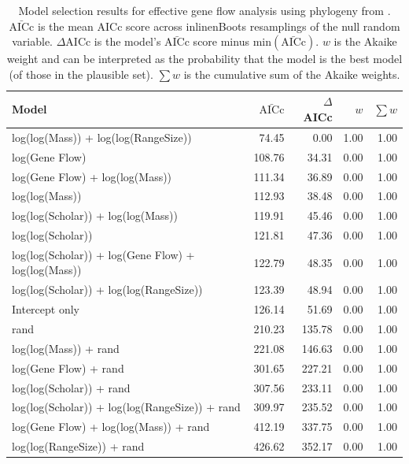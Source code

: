 \begin{table}[ht]
\centering
\caption[
  Full model selection results for effective gene flow analysis with alternative phylogeny. 
]{
  Model selection results for effective gene flow analysis using phylogeny from \cite{jones2005bats}. 
  $\bar{\text{AICc}}$ is the mean AICc score across 
inline{nBoots} resamplings of the null random variable. 
  $\Delta$AICc is the model's $\bar{\text{AICc}}$ score minus $\text{min}(\bar{\text{AICc}})$. 
  $w$ is the Akaike weight and can be interpreted as the probability that the model is the best model (of those in the plausible set).
  $\sum w$ is the cumulative sum of the Akaike weights.
  } 
\label{A-fstModelWeights2}
\begingroup\scriptsize
\begin{tabular}{@{}lrrrr@{}}
  \toprule
Model & $\bar{\text{AICc}}$ & $\Delta$AICc & $w$ & $\sum w$ \\ 
  \midrule
log(log(Mass)) + log(log(RangeSize)) & 74.45 & 0.00 & 1.00 & 1.00 \\ 
  log(Gene Flow) & 108.76 & 34.31 & 0.00 & 1.00 \\ 
  log(Gene Flow) + log(log(Mass)) & 111.34 & 36.89 & 0.00 & 1.00 \\ 
  log(log(Mass)) & 112.93 & 38.48 & 0.00 & 1.00 \\ 
  log(log(Scholar)) + log(log(Mass)) & 119.91 & 45.46 & 0.00 & 1.00 \\ 
  log(log(Scholar)) & 121.81 & 47.36 & 0.00 & 1.00 \\ 
  log(log(Scholar)) + log(Gene Flow) + log(log(Mass)) & 122.79 & 48.35 & 0.00 & 1.00 \\ 
  log(log(Scholar)) + log(log(RangeSize)) & 123.39 & 48.94 & 0.00 & 1.00 \\ 
  Intercept only & 126.14 & 51.69 & 0.00 & 1.00 \\ 
  rand & 210.23 & 135.78 & 0.00 & 1.00 \\ 
  log(log(Mass)) + rand & 221.08 & 146.63 & 0.00 & 1.00 \\ 
  log(Gene Flow) + rand & 301.65 & 227.21 & 0.00 & 1.00 \\ 
  log(log(Scholar)) + rand & 307.56 & 233.11 & 0.00 & 1.00 \\ 
  log(log(Scholar)) + log(log(RangeSize)) + rand & 309.97 & 235.52 & 0.00 & 1.00 \\ 
  log(Gene Flow) + log(log(Mass)) + rand & 412.19 & 337.75 & 0.00 & 1.00 \\ 
  log(log(RangeSize)) + rand & 426.62 & 352.17 & 0.00 & 1.00 \\ 

\end{tabular}
\end{table}
